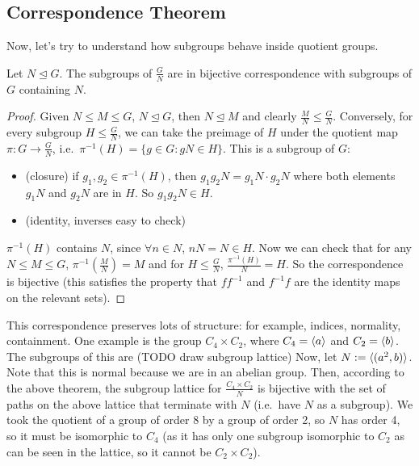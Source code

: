 \subsection{Correspondence Theorem}
Now, let's try to understand how subgroups behave inside quotient groups.
\begin{theorem}
	Let \(N \trianglelefteq G\).
	The subgroups of \(\frac{G}{N}\) are in bijective correspondence with subgroups of \(G\) containing \(N\).
\end{theorem}
\begin{proof}
	Given \(N \leq M \leq G\), \(N \trianglelefteq G\), then \(N \trianglelefteq M\) and clearly \(\frac{M}{N} \leq \frac{G}{N}\).
	Conversely, for every subgroup \(H \leq \frac{G}{N}\), we can take the preimage of \(H\) under the quotient map \(\pi : G \to \frac{G}{N}\), i.e.\ \(\pi^{-1}(H) = \{ g \in G : gN \in H \}\).
	This is a subgroup of \(G\):
	\begin{itemize}
		\item (closure) if \(g_1, g_2 \in \pi^{-1}(H)\), then \(g_1g_2N = g_1N\cdot g_2N\) where both elements \(g_1N\) and \(g_2N\) are in \(H\).
		      So \(g_1g_2N \in H\).
		\item (identity, inverses easy to check)
	\end{itemize}
	\(\pi^{-1}(H)\) contains \(N\), since \(\forall n \in N\), \(nN = N \in H\).
	Now we can check that for any \(N \leq M \leq G\), \(\pi^{-1}(\frac{M}{N}) = M\) and for \(H \leq \frac{G}{N}\), \(\frac{\pi^{-1}(H)}{N} = H\).
	So the correspondence is bijective (this satisfies the property that \(ff^{-1}\) and \(f^{-1}f\) are the identity maps on the relevant sets).
\end{proof}
This correspondence preserves lots of structure: for example, indices, normality, containment.
One example is the group \(C_4 \times C_2\), where \(C_4 = \langle{} a \rangle\) and \(C_2 = \langle{} b \rangle\).
The subgroups of this are (TODO draw subgroup lattice)
Now, let \(N := \langle{} (a^2, b) \rangle\).
Note that this is normal because we are in an abelian group.
Then, according to the above theorem, the subgroup lattice for \(\frac{C_4 \times C_2}{N}\) is bijective with the set of paths on the above lattice that terminate with \(N\) (i.e.\ have \(N\) as a subgroup).
We took the quotient of a group of order 8 by a group of order 2, so \(N\) has order 4, so it must be isomorphic to \(C_4\) (as it has only one subgroup isomorphic to \(C_2\) as can be seen in the lattice, so it cannot be \(C_2 \times C_2\)).

